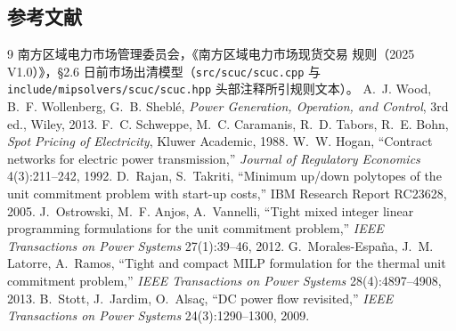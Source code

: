 \subsection{参考文献}

\begin{thebibliography}{9}\small
{} 南方区域电力市场管理委员会，《南方区域电力市场现货交易
规则（2025 V1.0）》，§2.6 日前市场出清模型（\texttt{src/scuc/scuc.cpp} 与
\texttt{include/mipsolvers/scuc/scuc.hpp} 头部注释所引规则文本）。
 A.~J. Wood, B.~F. Wollenberg, G.~B. Shebl\'e,
\emph{Power Generation, Operation, and Control}, 3rd ed., Wiley, 2013.
 F.~C. Schweppe, M.~C. Caramanis, R.~D. Tabors,
R.~E. Bohn, \emph{Spot Pricing of Electricity}, Kluwer Academic, 1988.
 W.~W. Hogan, ``Contract networks for electric power
transmission,'' \emph{Journal of Regulatory Economics} 4(3):211--242, 1992.
 D.~Rajan, S.~Takriti, ``Minimum up/down polytopes of the
unit commitment problem with start-up costs,'' IBM Research Report RC23628,
2005.
 J.~Ostrowski, M.~F. Anjos, A.~Vannelli, ``Tight mixed
integer linear programming formulations for the unit commitment problem,''
\emph{IEEE Transactions on Power Systems} 27(1):39--46, 2012.
 G.~Morales-Espa\~na, J.~M. Latorre, A.~Ramos, ``Tight
and compact MILP formulation for the thermal unit commitment problem,''
\emph{IEEE Transactions on Power Systems} 28(4):4897--4908, 2013.
 B.~Stott, J.~Jardim, O.~Alsa\c{c}, ``DC power flow
revisited,'' \emph{IEEE Transactions on Power Systems} 24(3):1290--1300, 2009.
\end{thebibliography}
